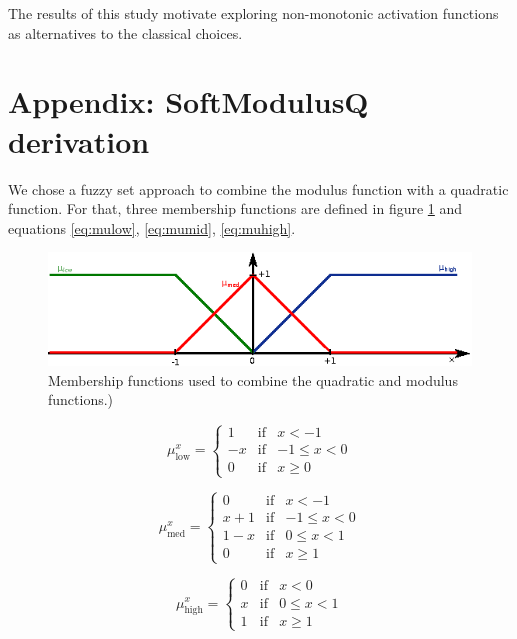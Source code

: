 The results of this study motivate exploring non-monotonic activation functions as alternatives to the classical choices.



\section*{Appendix: SoftModulusQ derivation}
We chose a fuzzy set approach to combine the modulus function with a quadratic function. For that, three membership functions are defined in figure \ref{fig:fuzzy} and equations \ref{eq:mulow}, \ref{eq:mumid}, \ref{eq:muhigh}.
\begin{figure}[h!]
	\centering
	\includegraphics[width=0.7\linewidth]{modulus/images/fuzzy}
	\caption{Membership functions used to combine the quadratic and modulus functions.)}
	\label{fig:fuzzy}
\end{figure}

\begin{equation}
	\label{eq:mulow}
	\mu^x_{\text{low}}= \left\{ \begin{array}{lcc}
		1 &   \text{if}  & x < -1 \\
		-x & \text{if}  & -1 \leq x < 0 \\
		0 &  \text{if} & x \geq 0
		\end{array}
		\right.
\end{equation}

\begin{equation}
	\label{eq:mumid}
	\mu^x_{\text{med}}= \left\{ \begin{array}{lcc}
		0 &   \text{if}  & x < -1 \\
		x+1 & \text{if}  & -1 \leq x < 0 \\
		1-x & \text{if}  & 0 \leq x < 1 \\
		0 &  \text{if} & x \geq 1
		\end{array}
		\right.
\end{equation}

\begin{equation}
	\label{eq:muhigh}
	\mu^x_{\text{high}}= \left\{ \begin{array}{lcc}
	0 &   \text{if}  & x < 0 \\
	x & \text{if}  & 0 \leq x < 1 \\
	1 &  \text{if} & x \geq 1
	\end{array}
	\right.
\end{equation}

